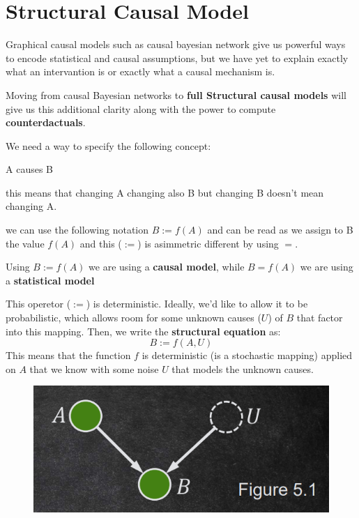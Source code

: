 \chapter{Structural Causal Model}
Graphical causal models such as causal bayesian network give us powerful ways to encode
statistical and causal assumptions, but we have yet to explain exactly what an intervantion
is or exactly what a causal mechanism is.

Moving from causal Bayesian networks to \textbf{full Structural causal models} will give
us this additional clarity along with the power to compute \textbf{counterdactuals}.

We need a way to specify the following concept:
\begin{center}
    A causes B
\end{center}

this means that changing A changing also B but changing B doesn't mean changing A.

we can use the following notation $B := f(A)$ and can be read as we assign to B the
value $f(A)$ and this ($:=$) is asimmetric different by using $=$.

\begin{note}
    Using $B := f(A)$ we are using a \textbf{causal model}, while $B = f(A)$ we
    are using a \textbf{statistical model}
\end{note}

This operetor ($:=$) is deterministic. Ideally, we'd like to allow it to be
probabilistic, which allows room for some unknown causes ($U$) of $B$ that factor into
this mapping. Then, we write the \textbf{structural equation} as:
\begin{equation}
    B := f(A, U)
\end{equation}
This means that the function $f$ is deterministic (is a stochastic mapping) applied on
$A$ that we know with some noise $U$ that models the unknown causes.

\begin{figure}[h]
    \centering
    \includegraphics*[width=0.7 \textwidth]{img/uknown_graphs.png}
\end{figure}

